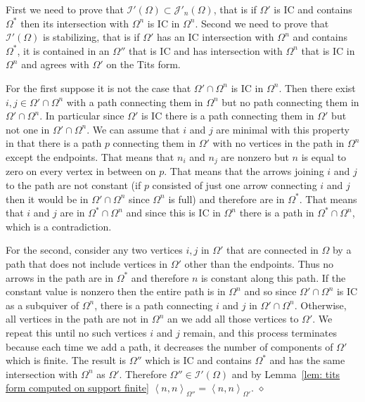 \documentclass{article}
\newcommand{\bracket}[1]{\left \langle #1 \right\rangle}
\newenvironment{proof}{\vspace*{2ex}\noindent {\em Proof:}
}{\hfill $\diamond$ \\[2ex]}
\begin{document}
\begin{proof}
First we need to prove that $\mathcal{I}'(\Omega) \subset \mathcal{J}'_n(\Omega)$, that is if $\Omega'$ is IC and contains $\Omega^*$ then its intersection with $\Omega^n$ is IC in $\Omega^n$. Second we need to prove  that $\mathcal{I}'(\Omega)$ is stabilizing, that is if $\Omega'$ has an IC intersection with $\Omega^n$ and contains $\Omega^*$, it is contained in an $\Omega''$ that is IC and has intersection with $\Omega^n$ that is IC in $\Omega^n$ and agrees with $\Omega'$ on the Tits form.

For the first suppose it is not the case that $\Omega' \cap \Omega^n$ is IC in $\Omega^n$.  Then there exist $i,j \in \Omega' \cap \Omega^n$ with a path connecting them in $\Omega^n$ but no path connecting them in $\Omega' \cap \Omega^n$. In particular since $\Omega'$ is IC there is a path connecting them in $\Omega'$ but not one in $\Omega' \cap \Omega^n$.  We can assume that $i$ and $j$ are minimal with this property in that there is a path $p$  connecting them in $\Omega'$ with no vertices in the path in $\Omega^n$ except the endpoints. That means that $n_i$ and $n_j$ are nonzero but $n$ is equal to zero on every vertex in between on $p$.  That means that the arrows joining $i$ and $j$ to the path are not constant (if $p$ consisted of just one arrow connecting $i$ and $j$ then it would be in $\Omega' \cap \Omega^n$ since $\Omega^n$ is full) and therefore are in $\Omega^*$.  That means that $i$ and $j$ are in $\Omega^* \cap \Omega^n$ and since this is IC in $\Omega^n$ there is a path in $\Omega^* \cap \Omega^n$, which is a contradiction.

For the second, consider any two vertices $i,j$ in $\Omega'$ that are connected in $\Omega$ by a path that does not include vertices in $\Omega'$ other than the endpoints.  Thus no arrows in the path are in $\Omega^*$ and therefore $n$ is constant along this path. If the constant value is nonzero then the entire path is in $\Omega^n$ and so since $\Omega' \cap \Omega^n$ is IC as a subquiver of $\Omega^n$, there is a path connecting $i$ and $j$ in $\Omega' \cap \Omega^n$. Otherwise, all vertices in the path are not in $\Omega^n$ an we add all those vertices to $\Omega'$. We repeat this until no such vertices $i$ and $j$ remain, and this process terminates because each time we add a path, it decreases the number of components of $\Omega'$ which is finite. The result is $\Omega''$ which is IC and contains $\Omega^*$ and has the same intersection with $\Omega^n$ as $\Omega'$. Therefore $\Omega'' \in \mathcal{I}'(\Omega)$ and by Lemma~\ref{lem: tits form computed on support finite} $\bracket{n , n}_{\Omega''} = \bracket{n , n}_{\Omega'}$.
\end{proof}
\end{document}
